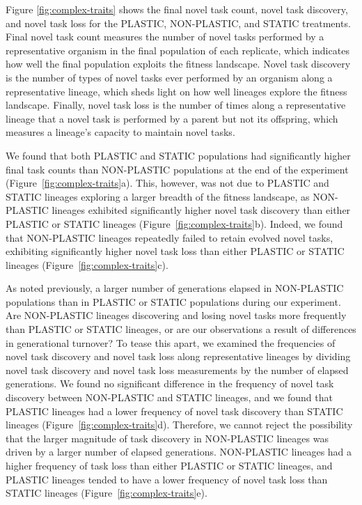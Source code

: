 Figure \ref{fig:complex-traits} shows the final novel task count, novel task discovery, and novel task loss for the PLASTIC, NON-PLASTIC, and STATIC treatments.
Final novel task count measures the number of novel tasks performed by a representative organism in the final population of each replicate, which indicates how well the final population exploits the fitness landscape.
Novel task discovery is the number of types of novel tasks ever performed by an organism along a representative lineage, which sheds light on how well lineages explore the fitness landscape. 
Finally, novel task loss is the number of times along a representative lineage that a novel task is performed by a parent but not its offspring, which measures a lineage's capacity to maintain novel tasks. 

We found that both PLASTIC and STATIC populations had significantly higher final task counts than NON-PLASTIC populations at the end of the experiment (Figure~\ref{fig:complex-traits}a).
This, however, was not due to PLASTIC and STATIC lineages exploring a larger breadth of the fitness landscape, as NON-PLASTIC lineages exhibited significantly higher novel task discovery than either PLASTIC or STATIC lineages (Figure~\ref{fig:complex-traits}b).
Indeed, we found that NON-PLASTIC lineages repeatedly failed to retain evolved novel tasks, exhibiting significantly higher novel task loss than either PLASTIC or STATIC lineages (Figure~\ref{fig:complex-traits}c).

As noted previously, a larger number of generations elapsed in NON-PLASTIC populations than in PLASTIC or STATIC populations during our experiment.
Are NON-PLASTIC lineages discovering and losing novel tasks more frequently than PLASTIC or STATIC lineages, or are our observations a result of differences in generational turnover?
To tease this apart, we examined the frequencies of novel task discovery and novel task loss along representative lineages by dividing novel task discovery and novel task loss measurements by the number of elapsed generations.
We found no significant difference in the frequency of novel task discovery between NON-PLASTIC and STATIC lineages, and we found that PLASTIC lineages had a lower frequency of novel task discovery than STATIC lineages (Figure~\ref{fig:complex-traits}d).
Therefore, we cannot reject the possibility that the larger magnitude of task discovery in NON-PLASTIC lineages was driven by a larger number of elapsed generations.
NON-PLASTIC lineages had a higher frequency of task loss than either PLASTIC or STATIC lineages, and PLASTIC lineages tended to have a lower frequency of novel task loss than STATIC lineages (Figure~\ref{fig:complex-traits}e). 

